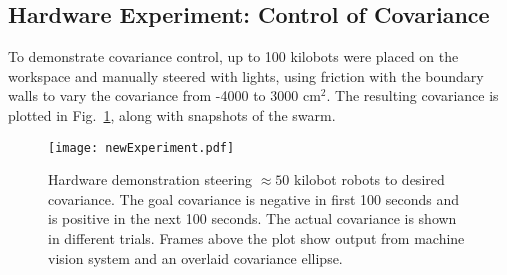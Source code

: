 \subsection{Hardware Experiment: Control of Covariance}
To demonstrate covariance control, up to 100 kilobots were placed on the workspace and manually steered with lights, using friction with the boundary walls to vary the covariance from  -4000 to 3000 cm$^2$.  The resulting covariance is plotted in Fig.~\ref{fig:covExperiment}, along with snapshots of the swarm.




\begin{figure}
\begin{center}
	\texttt{[image: newExperiment.pdf]}
\end{center}
\vspace{-1em}
\caption{\label{fig:covExperiment}
Hardware demonstration steering $\approx 50$ kilobot robots to desired covariance. The goal covariance is negative in first 100 seconds and is positive in the next 100 seconds. The actual covariance is shown in different trials. Frames above the plot show output from machine vision system and an overlaid covariance ellipse.
\vspace{-1em}
}
\end{figure}

